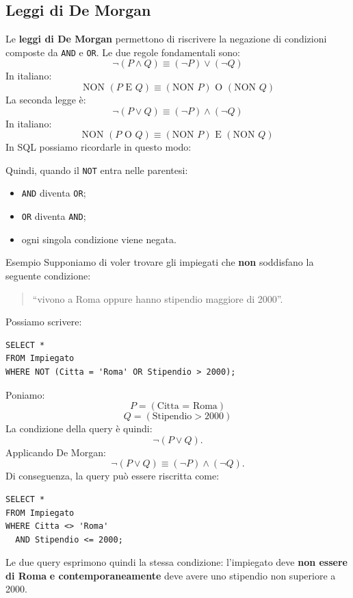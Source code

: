 \subsection{Leggi di De Morgan}
Le \textbf{leggi di De Morgan} permettono di riscrivere la negazione
di condizioni composte da \texttt{AND} e \texttt{OR}.
Le due regole fondamentali sono:
\[
\boxed{
\neg(P \land Q)
\equiv
(\neg P) \lor (\neg Q)
}
\]
In italiano:
\[
\
\text{NON }(P \text{ E } Q)
\equiv
(\text{NON }P) \text{ O } (\text{NON }Q)
\]
La seconda legge è:
\[
\boxed{
\neg(P \lor Q)
\equiv
(\neg P) \land (\neg Q)
}
\]
In italiano:
\[
\text{NON }(P \text{ O } Q)
\equiv
(\text{NON }P) \text{ E } (\text{NON }Q)
\]
In SQL possiamo ricordarle in questo modo:
\begin{center}
\end{center}
\begin{center}
\end{center}
Quindi, quando il \texttt{NOT} entra nelle parentesi:
\begin{itemize}
    \item \texttt{AND} diventa \texttt{OR};
    \item \texttt{OR} diventa \texttt{AND};
    \item ogni singola condizione viene negata.
\end{itemize}
\textcolor{verdeEsempio}{Esempio}
Supponiamo di voler trovare gli impiegati che \textbf{non} soddisfano
la seguente condizione:
\begin{quote}
``vivono a Roma oppure hanno stipendio maggiore di 2000''.
\end{quote}
Possiamo scrivere:
\begin{verbatim}
SELECT *
FROM Impiegato
WHERE NOT (Citta = 'Roma' OR Stipendio > 2000);
\end{verbatim}
Poniamo:
\[
P = (\text{Citta = Roma})
\]
\[
Q = (\text{Stipendio} > 2000)
\]
La condizione della query è quindi:
\[
\neg(P \lor Q).
\]
Applicando De Morgan:
\[
\neg(P \lor Q)
\equiv
(\neg P) \land (\neg Q).
\]
Di conseguenza, la query può essere riscritta come:
\begin{verbatim}
SELECT *
FROM Impiegato
WHERE Citta <> 'Roma'
  AND Stipendio <= 2000;
\end{verbatim}
Le due query esprimono quindi la stessa condizione:
l'impiegato deve \textbf{non essere di Roma}
\textbf{e contemporaneamente} deve avere uno stipendio
non superiore a 2000.

